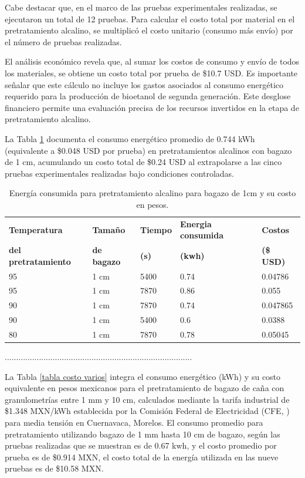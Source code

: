 \documentclass[12pt]{article}
\begin{document}
     Cabe destacar que, en el marco de las pruebas experimentales realizadas, se ejecutaron un total de 12 pruebas. Para calcular el costo total por material en el pretratamiento alcalino, se multiplicó el costo unitario (consumo más envío) por el número de pruebas realizadas.

    El análisis económico revela que, al sumar los costos de consumo y envío de todos los materiales, se obtiene un costo total por prueba de \$10.7 USD. Es importante señalar que este cálculo no incluye los gastos asociados al consumo energético requerido para la producción de bioetanol de segunda generación. Este desglose financiero permite una evaluación precisa de los recursos invertidos en la etapa de pretratamiento alcalino.
			
La Tabla \ref{tabla costo 1 cm} documenta el consumo energético promedio de 0.744 kWh (equivalente a \$0.048 USD por prueba) en pretratamientos alcalinos con bagazo de 1 cm, acumulando un costo total de \$0.24 USD al extrapolarse a las cinco pruebas experimentales realizadas bajo condiciones controladas.
			
			
\begin{table}[H]
	\centering
	\caption{Energía consumida para pretratamiento alcalino para bagazo de 1cm y su costo en pesos. }
	\label{tabla costo 1 cm}
	\resizebox{12cm}{!} {
	\begin{tabular}{|l|l|l|l|l|}
		\hline
		\textbf{Temperatura} & \textbf{Tamaño } & \textbf{Tiempo} & \textbf{Energia consumida} & \textbf{Costos } \\ 
		\textbf{del pretratamiento} &	\textbf{ de bagazo}  &	\textbf{ (s)} & 	\textbf{(kwh) }& 	\textbf{(\$ USD)} \\ \hline
		95 & 1 cm & 5400 & 0.74 & 0.04786  \\ \hline
		95 & 1 cm & 7870 & 0.86 & 0.055  \\ \hline
		90 & 1 cm & 7870 & 0.74 & 0.047865  \\ \hline
		90 & 1 cm & 5400 & 0.6 & 0.0388 \\ \hline
		80 & 1 cm & 7870 & 0.78 & 0.05045  \\ \hline
		
	
	\end{tabular}}
		
\end{table}
..................................................................................

La Tabla \ref{tabla costo varios} integra el consumo energético (kWh) y su costo equivalente en pesos mexicanos para el pretratamiento de bagazo de caña con granulometrías entre 1 mm y 10 cm, calculados mediante la tarifa industrial de \$1.348 MXN/kWh establecida por la Comisión Federal de Electricidad (CFE, \cite{CFE2023}) para media tensión en Cuernavaca, Morelos. El consumo promedio para pretratamiento utilizando bagazo de 1 mm hasta 10 cm de bagazo, según las pruebas realizadas que se muestran es de 0.67 kwh, y el costo promedio por prueba es de \$0.914 MXN, el costo total de la energía utilizada en las nueve pruebas es de \$10.58 MXN.
\end{document}
